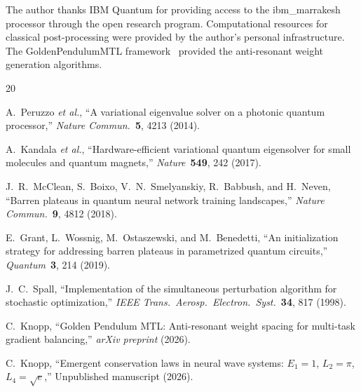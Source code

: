 \documentclass[twocolumn,showpacs,preprintnumbers,amsmath,amssymb,aps,prl]{revtex4-2}
\begin{document}
\begin{acknowledgments}
The author thanks IBM Quantum for providing access to the ibm\_marrakesh processor through the open research program. Computational resources for classical post-processing were provided by the author's personal infrastructure. The GoldenPendulumMTL framework~\cite{knopp2026golden} provided the anti-resonant weight generation algorithms.
\end{acknowledgments}

\begin{thebibliography}{20}

A.~Peruzzo \textit{et al.},
``A variational eigenvalue solver on a photonic quantum processor,''
\textit{Nature Commun.}~\textbf{5}, 4213 (2014).

A.~Kandala \textit{et al.},
``Hardware-efficient variational quantum eigensolver for small molecules and quantum magnets,''
\textit{Nature}~\textbf{549}, 242 (2017).

J.~R.~McClean, S.~Boixo, V.~N.~Smelyanskiy, R.~Babbush, and H.~Neven,
``Barren plateaus in quantum neural network training landscapes,''
\textit{Nature Commun.}~\textbf{9}, 4812 (2018).

E.~Grant, L.~Wossnig, M.~Ostaszewski, and M.~Benedetti,
``An initialization strategy for addressing barren plateaus in parametrized quantum circuits,''
\textit{Quantum}~\textbf{3}, 214 (2019).

J.~C.~Spall,
``Implementation of the simultaneous perturbation algorithm for stochastic optimization,''
\textit{IEEE Trans.\ Aerosp.\ Electron.\ Syst.}~\textbf{34}, 817 (1998).

C.~Knopp,
``Golden Pendulum MTL: Anti-resonant weight spacing for multi-task gradient balancing,''
\textit{arXiv preprint} (2026).

C.~Knopp,
``Emergent conservation laws in neural wave systems: $E_1 = 1$, $L_2 = \pi$, $L_4 = \sqrt{e}$,''
Unpublished manuscript (2026).

\end{thebibliography}
\end{document}
